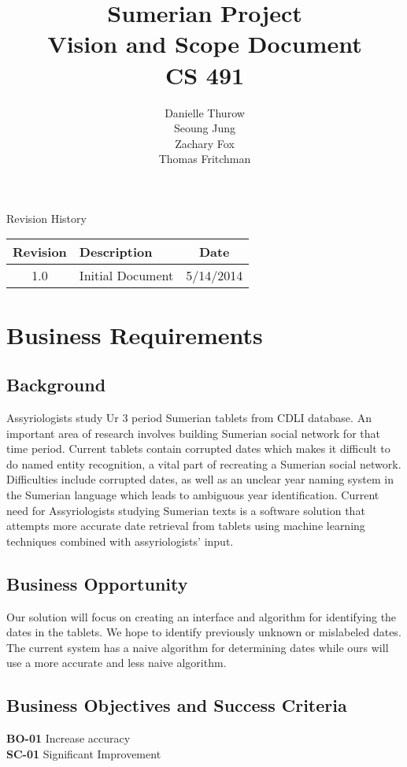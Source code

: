 \documentclass[11pt]{article}
\title{Sumerian Project\\
Vision and Scope Document\\
CS 491}
\author{Danielle Thurow \\
Seoung Jung\\
Zachary Fox\\
Thomas Fritchman}
\date{}
\begin{document}
\maketitle
\newpage

\tableofcontents
\newpage

\begin{center}
\Large Revision History\\
\begin{tabularx}{\textwidth}{|c|X|c|}
\hline
\textbf{Revision} & \textbf{Description} & \textbf{Date}\\ \hline
1.0 & Initial Document & 5/14/2014\\ \hline
\end{tabularx}
\end{center}
\newpage

\section{Business Requirements}
\subsection{Background}
Assyriologists study Ur 3 period Sumerian tablets from CDLI database. An important area of research involves building Sumerian social network for that time period. Current tablets contain corrupted dates which makes it difficult to do named entity recognition, a vital part of recreating a Sumerian social network. Difficulties include corrupted dates, as well as an unclear year naming system in the Sumerian language which leads to ambiguous year identification. Current need for Assyriologists studying Sumerian texts is a software solution that attempts more accurate date retrieval from tablets using machine learning techniques combined with assyriologists' input.
\subsection{Business Opportunity}
Our solution will focus on creating an interface and algorithm for identifying the dates in the tablets. We hope to identify previously unknown or mislabeled dates. The current system has a naive algorithm for determining dates while ours will use a more accurate and less naive algorithm.
\subsection{Business Objectives and Success Criteria}
\textbf{BO-01} Increase accuracy\\
\textbf{SC-01} Significant Improvement
\end{document}
